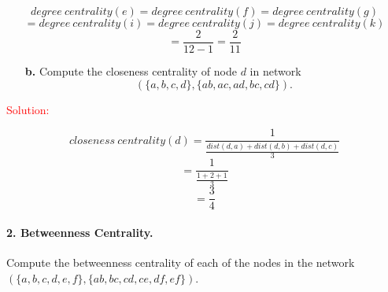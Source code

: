 \documentclass[11pt]{article} %
\begin{document}
$$degree \   centrality(e)=degree \   centrality(f)=degree \   centrality(g) $$
$$=degree  \  centrality(i)=degree  \  centrality(j)=degree \   centrality(k) $$
$$=\frac{2}{12-1}=\frac{2}{11}$$


\begin{enumerate} 
\item[\textbf{b.}]Compute the closeness centrality of node $d$ in network  $$(\{a,b,c,d\},\{ab,ac,ad,bc,cd\}).$$
 \end{enumerate}
 

\textcolor{red}{Solution:} 

 
\begin{center}
\end{center}
 

$$closeness \   centrality(d)=\displaystyle \frac{1}{\frac{dist(d,a)+dist(d,b)+dist(d,c)}{3}}$$
$$=\frac{1}{\frac{1+2+1}{3}}$$
$$=\frac{3}{4}$$








































\paragraph{2. Betweenness Centrality.} Compute the betweenness centrality of each of the nodes in the network $(\{a,b,c,d,e,f\}, \{ab,bc,cd,ce,df,ef\})$. 
\end{document}

